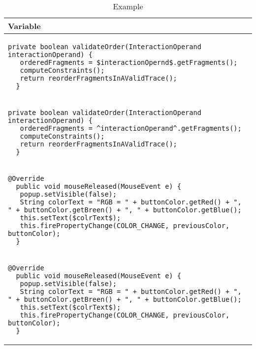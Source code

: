 \begin{table}[p]
\begin{tabular}{ | m{11cm} | }
  \hline
  Variable \\
  \hline
  {\begin{lstlisting}[style=table]
  private boolean validateOrder(InteractionOperand interactionOperand) {
   orderedFragments = $interactionOpernd$.getFragments();
   computeConstraints();
   return reorderFragmentsInAValidTrace();
  }
  \end{lstlisting}} \\
  {\begin{lstlisting}[style=table]
  private boolean validateOrder(InteractionOperand interactionOperand) {
   orderedFragments = ^interactionOperand^.getFragments();
   computeConstraints();
   return reorderFragmentsInAValidTrace();
  }
  \end{lstlisting}} \\
  \hline
  \hline
  {\begin{lstlisting}[style=table]
  @Override
  public void mouseReleased(MouseEvent e) {
   popup.setVisible(false);
   String colorText = "RGB = " + buttonColor.getRed() + ", " + buttonColor.getBreen() + ", " + buttonColor.getBlue();
   this.setText($colrText$);
   this.firePropertyChange(COLOR_CHANGE, previousColor, buttonColor);
  }
  \end{lstlisting}} \\
  {\begin{lstlisting}[style=table]
  @Override
  public void mouseReleased(MouseEvent e) {
   popup.setVisible(false);
   String colorText = "RGB = " + buttonColor.getRed() + ", " + buttonColor.getBreen() + ", " + buttonColor.getBlue();
   this.setText($colrText$);
   this.firePropertyChange(COLOR_CHANGE, previousColor, buttonColor);
  }
  \end{lstlisting}} \\
  \hline
\end{tabular}
\caption{Example}
\label{variable_showcase_table}
\end{table}

